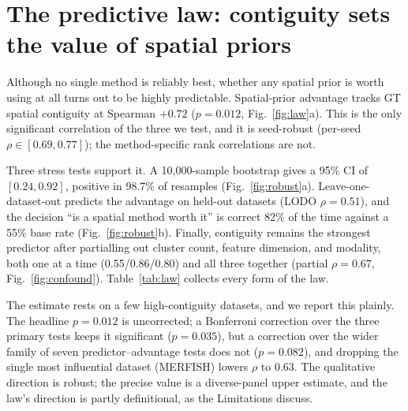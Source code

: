 \documentclass[journal]{IEEEtran}
\begin{document}
\section{The predictive law: contiguity sets the value of spatial priors}\label{sec:law}
Although no single method is reliably best, whether any spatial prior is worth using at all turns out to be
highly predictable. Spatial-prior advantage tracks GT spatial contiguity at Spearman $+0.72$ ($p=0.012$,
Fig.~\ref{fig:law}a). This is the only significant correlation of the three we test, and it is seed-robust
(per-seed $\rho\in[0.69,0.77]$); the method-specific rank correlations are not.

Three stress tests support it. A 10{,}000-sample bootstrap gives a 95\% CI of $[0.24,0.92]$, positive in 98.7\% of resamples
(Fig.~\ref{fig:robust}a). Leave-one-dataset-out predicts the advantage on held-out datasets (LODO
$\rho=0.51$), and the decision ``is a spatial method worth it'' is correct 82\% of the time against a 55\%
base rate (Fig.~\ref{fig:robust}b). Finally, contiguity remains the strongest predictor after partialling out
cluster count, feature dimension, and modality, both one at a time (0.55/0.86/0.80) and all three together
(partial $\rho=0.67$, Fig.~\ref{fig:confound}). Table~\ref{tab:law} collects every form of the law.

The estimate rests on a few high-contiguity datasets, and we report this plainly. The headline $p=0.012$ is
uncorrected; a Bonferroni correction over the three primary tests keeps it significant ($p=0.035$), but a
correction over the wider family of seven predictor--advantage tests does not ($p=0.082$), and dropping the
single most influential dataset (MERFISH) lowers $\rho$ to $0.63$. The qualitative direction is robust; the
precise value is a diverse-panel upper estimate, and the law's direction is partly definitional, as the
Limitations discuss.
\end{document}
